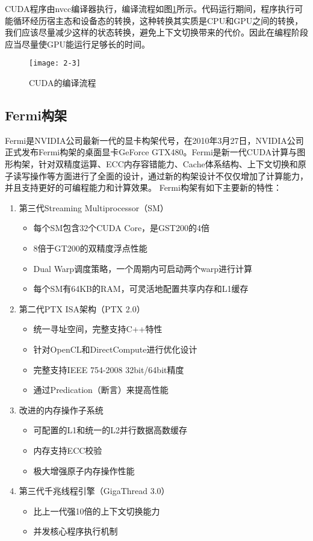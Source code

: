 CUDA程序由nvcc编译器执行，编译流程如图\ref{fig:2.3}所示。代码运行期间，程序执行可能循环经历宿主态和设备态的转换，这种转换其实质是CPU和GPU之间的转换，我们应该尽量减少这样的状态转换，避免上下文切换带来的代价。因此在编程阶段应当尽量使GPU能运行足够长的时间。
\begin{figure}[!ht]
\centering
\texttt{[image: 2-3]}
\caption{CUDA的编译流程}
\label{fig:2.3}
\end{figure}
\subsection{Fermi构架}
Fermi是NVIDIA公司最新一代的显卡构架代号，在2010年3月27日，NVIDIA公司正式发布Fermi构架的桌面显卡GeForce GTX480。Fermi是新一代CUDA计算与图形构架，针对双精度运算、ECC内存容错能力、Cache体系结构、上下文切换和原子读写操作等方面进行了全面的设计，通过新的构架设计不仅仅增加了计算能力，并且支持更好的可编程能力和计算效果。
Fermi构架有如下主要新的特性：
\begin{enumerate}
\item 第三代Streaming Multiprocessor（SM）
	\begin{itemize}
	\item 每个SM包含32个CUDA Core，是GST200的4倍 
	\item 8倍于GT200的双精度浮点性能
	\item Dual Warp调度策略，一个周期内可启动两个warp进行计算
	\item 每个SM有64KB的RAM，可灵活地配置共享内存和L1缓存
	\end{itemize}
\item 第二代PTX ISA架构（PTX 2.0）
	\begin{itemize}
	\item 统一寻址空间，完整支持C++特性
	\item 针对OpenCL和DirectCompute进行优化设计
	\item 完整支持IEEE 754-2008 32bit/64bit精度
	\item 通过Predication（断言）来提高性能
	\end{itemize}
\item 改进的内存操作子系统
	\begin{itemize}
	\item 可配置的L1和统一的L2并行数据高数缓存
	\item 内存支持ECC校验
	\item 极大增强原子内存操作性能
	\end{itemize}
\item 第三代千兆线程引擎（GigaThread 3.0）
	\begin{itemize}
	\item 比上一代强10倍的上下文切换能力
	\item 并发核心程序执行机制
	\end{itemize}
\end{enumerate}
